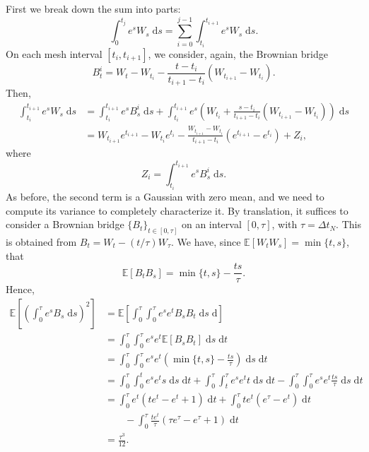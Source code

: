 \documentclass[reqno,12pt]{amsart}
\theoremstyle{plain}%
\theoremstyle{definition}
\begin{document}
First we break down the sum into parts:
\begin{equation}
    \int_0^{t_j} e^s W_s\;\mathrm{d}s = \sum_{i = 0}^{j-1} \int_{t_i}^{t_{i+1}} e^s W_s\;\mathrm{d}s.
\end{equation}
On each mesh interval $[t_i, t_{i+1}]$, we consider, again, the Brownian bridge
\begin{equation}
    B_t^i = W_t - W_{t_i} - \frac{t - t_i}{t_{i+1}-t_i}(W_{t_{i+1}} - W_{t_i}).
\end{equation}
Then,
\begin{align*}
    \int_{t_i}^{t_{i+1}} e^s W_s\;\mathrm{d}s & = \int_{t_i}^{t_{i+1}} e^s B_s^i\;\mathrm{d}s + \int_{t_i}^{t_{i+1}} e^s\left( W_{t_i} + \frac{s - t_i}{t_{i+1}-t_i}(W_{t_{i+1}} - W_{t_i})\right)\;\mathrm{d}s \\
    & = W_{t_{i+1}}e^{t_{i+1}} - W_{t_i}e^{t_i} - \frac{W_{t_{i+1}}-W_{t_i}}{t_{i+1}-t_i}\left(e^{t_{i+1}}-e^{t_i}\right) + Z_i,
\end{align*}
where
\begin{equation}
    Z_i = \int_{t_i}^{t_{i+1}} e^s B_s^i\;\mathrm{d}s.
\end{equation}
As before, the second term is a Gaussian with zero mean, and we need to compute its variance to completely characterize it. By translation, it suffices to consider a Brownian bridge $\{B_t\}_{t\in [0, \tau]}$ on an interval $[0, \tau]$, with $\tau = \Delta t_N$. This is obtained from $B_t = W_t - (t/\tau)W_\tau$. We have, since $\mathbb{E}[W_tW_s] = \min\{t, s\}$, that
\[
    \mathbb{E}[B_tB_s] = \min\{t, s\} - \frac{ts}{\tau}.
\]
Hence,
\begin{align*}
    \mathbb{E}\left[\left(\int_0^{\tau} e^s B_s\;\mathrm{d}s\right)^2\right] & = \mathbb{E}\left[\int_0^{\tau} \int_0^\tau e^s e^t B_sB_t\;\mathrm{d}s\;\mathrm{d}\right] \\
    & = \int_0^\tau \int_0^\tau e^s e^t \mathbb{E}[B_sB_t] \;\mathrm{d}s\;\mathrm{d}t \\
    & = \int_0^\tau \int_0^\tau e^s e^t\left(\min\{t, s\} - \frac{ts}{\tau}\right) \;\mathrm{d}s\;\mathrm{d}t \\
    & = \int_0^\tau \int_0^t e^s e^t s\;\mathrm{d}s\;\mathrm{d}t + \int_0^\tau \int_t^\tau e^s e^t t\;\mathrm{d}s\;\mathrm{d}t - \int_0^\tau \int_0^\tau e^s e^t \frac{ts}{\tau} \;\mathrm{d}s\;\mathrm{d}t \\
    & = \int_0^\tau e^t(te^t-e^t+1)\;\mathrm{d}t + \int_0^\tau te^t(e^\tau - e^t)\;\mathrm{d}t \\
    & \qquad - \int_0^\tau \frac{te^t}{\tau}\left(\tau e^\tau - e^\tau + 1\right)\;\mathrm{d}t \\
    & = \frac{\tau^3}{12}.
\end{align*}
\end{document}
